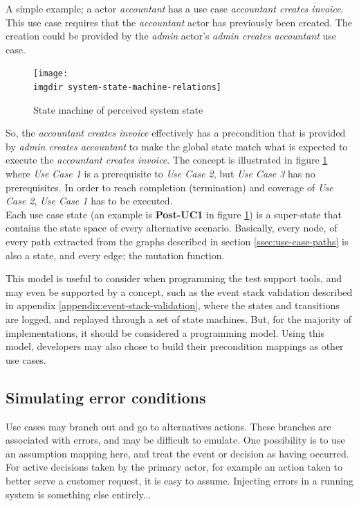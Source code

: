 \noindent A simple example; a actor \emph{accountant} has a use case \emph{accountant creates invoice}. This use case requires that the \emph{accountant} actor has previously been created. The creation could be provided by the \emph{admin} actor's \emph{admin creates accountant} use case.
\begin{figure}[h]
\texttt{[image: \\imgdir system-state-machine-relations]}
\centering
\caption{State machine of perceived system state}
\label{fig:system-state-machine-relations}
\end{figure}
So, the \emph{accountant creates invoice} effectively has a precondition that is provided by \emph{admin creates accountant} to make the global state match what is expected to execute the \emph{accountant creates invoice}. The concept is illustrated in figure \ref{fig:system-state-machine-relations} where \emph{Use Case 1} is a prerequisite to \emph{Use Case 2}, but \emph{Use Case 3} has no prerequisites. In order to reach completion (termination) and coverage of \emph{Use Case 2}, \emph{Use Case 1} has to be executed.\\
Each use case state (an example is \textbf{Post-UC1} in figure \ref{fig:system-state-machine-relations}) is a super-state that contains the state space of every alternative scenario. Basically, every node, of every path extracted from the graphs described in section \ref{ssec:use-case-paths} is also a state, and every edge; the mutation function.\bigskip

\noindent This model is useful to consider when programming the test support tools, and may even be supported by a concept, such as the event stack validation described in appendix \ref{appendix:event-stack-validation}, where the states and transitions are logged, and replayed through a set of state machines. But, for the majority of implementations, it should be considered a programming model. Using this model, developers may also chose to build their precondition mappings as other use cases.


\subsection{Simulating error conditions}
Use cases may branch out and go to alternatives actions. These branches are associated with errors, and may be difficult to emulate. One possibility is to use an assumption mapping here, and treat the event or decision as having occurred. For active decisions taken by the primary actor, for example an action taken to better serve a customer request, it is easy to assume. Injecting errors in a running system is something else entirely... %


